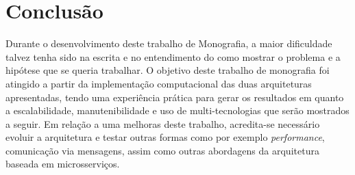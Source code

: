 
\chapter*[Conclus\~{a}o]{Conclus\~{a}o}                  \label{conclusao}





Durante o desenvolvimento deste trabalho de Monografia, a maior dificuldade talvez tenha sido na escrita e no entendimento do como mostrar o problema e a hipótese que se queria trabalhar.
O objetivo deste trabalho de monografia foi atingido a partir da implementação computacional das duas arquiteturas apresentadas, tendo uma experiência prática para gerar os resultados em quanto a escalabilidade, manutenibilidade e uso de multi-tecnologias que serão mostrados a seguir. 
Em relação a uma melhoras deste trabalho, acredita-se necessário evoluir a arquitetura e testar outras formas como por exemplo \textit{performance}, comunicação via mensagens, assim como outras abordagens da arquitetura baseada em microsserviços. %

